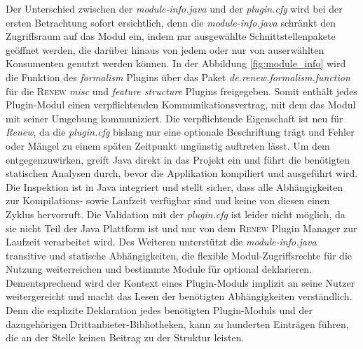 			Der Unterschied zwischen der \textit{module-info.java} und der \textit{plugin.cfg} wird bei der ersten Betrachtung sofort ersichtlich, denn die \textit{module-info.java} schränkt den Zugriffsraum auf das Modul ein, indem nur ausgewählte Schnittstellenpakete geöffnet werden, die darüber hinaus von jedem oder nur von auserwählten Konsumenten genutzt werden können. In der Abbildung \ref{fig:module_info} wird die Funktion des \textit{formalism} Plugins über das Paket \textit{de.renew.formalism.function} für die \textsc{Renew} \textit{misc} und \textit{feature structure} Plugins freigegeben. \newline
			Somit enthält jedes Plugin-Modul einen verpflichtenden Kommunikationsvertrag, mit dem das Modul mit seiner Umgebung kommuniziert.\newline
			Die verpflichtende Eigenschaft ist neu für \textit{Renew}, da die \textit{plugin.cfg} bislang nur eine optionale Beschriftung trägt und Fehler oder Mängel zu einem späten Zeitpunkt ungünstig auftreten lässt. Um dem entgegenzuwirken, greift Java direkt in das Projekt ein und führt die benötigten statischen Analysen durch, bevor die Applikation kompiliert und ausgeführt wird. Die Inspektion ist in Java integriert und stellt sicher, dass alle Abhängigkeiten zur Kompilations- sowie Laufzeit verfügbar sind und keine von diesen einen Zyklus hervorruft.\newline
			Die Validation mit der \textit{plugin.cfg} ist leider nicht möglich, da sie nicht Teil der Java Plattform ist und nur von dem \textsc{Renew} Plugin Manager zur Laufzeit verarbeitet wird. Des Weiteren unterstützt die \textit{module-info.java} transitive und statische Abhängigkeiten, die flexible Modul-Zugriffsrechte für die Nutzung weiterreichen und bestimmte Module für optional deklarieren. Dementsprechend wird der Kontext eines Plugin-Moduls implizit an seine Nutzer weitergereicht und macht das Lesen der benötigten Abhängigkeiten verständlich. Denn die explizite Deklaration jedes benötigten Plugin-Moduls und der dazugehörigen Drittanbieter-Bibliotheken, kann zu hunderten Einträgen führen, die an der Stelle keinen Beitrag zu der Struktur leisten. 

